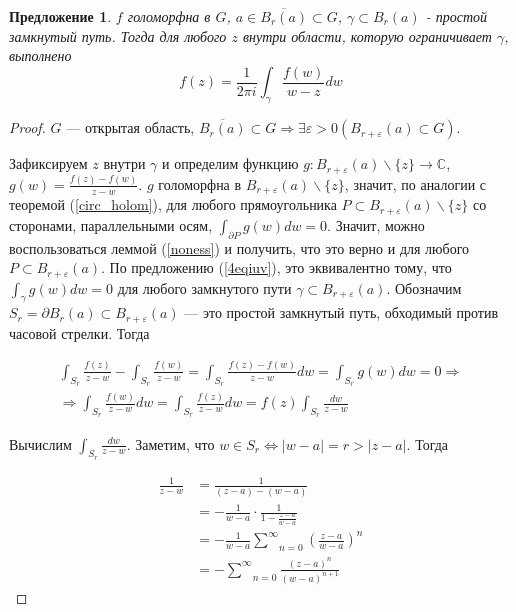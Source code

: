 \documentclass[12pt]{article}
\renewcommand{\C}{\mathbb{C}}
\newcommand{\Ra}{\Rightarrow}
\renewcommand{\iff}{\Leftrightarrow}
\newcounter{cnt}
\theoremstyle{thmnote}
\newtheorem{proposition}[cnt]{Предложение}
\theoremstyle{remark}
\theoremstyle{defnote}
\begin{document}
\begin{proposition}
    $f$ голоморфна в $G$, $a \in \overline{B_r(a)} \subset G$, $\gamma \subset B_r(a)$ - простой замкнутый путь. Тогда для любого $z$ внутри области, которую ограничивает $\gamma$, выполнено
    \begin{equation*}
        f(z) = \frac{1}{2 \pi i} \int_\gamma \frac{f(w)}{w - z} dw
    \end{equation*}
\end{proposition}
\begin{proof}
    $G$ --- открытая область, $\overline{B_r(a)} \subset G \Ra \exists \varepsilon > 0 \left( B_{r + \varepsilon}(a) \subset G \right)$.

    Зафиксируем $z$ внутри $\gamma$ и определим функцию $g: B_{r + \varepsilon}(a)\backslash\{z\} \to \C$, $g(w) = \frac{f(z) - f(w)}{z - w}$. $g$ голоморфна в $B_{r + \varepsilon}(a)\backslash\{z\}$, значит, по аналогии с теоремой (\ref{circ_holom}), для любого прямоугольника $P \subset B_{r + \varepsilon}(a)\backslash\{z\}$ со сторонами, параллельными осям, $\int_{\partial P} g(w)dw = 0$. Значит, можно воспользоваться леммой (\ref{noness}) и получить, что это верно и для любого $P \subset B_{r + \varepsilon}(a)$. По предложению (\ref{4eqiuv}), это эквивалентно тому, что $\int_{\gamma} g(w)dw = 0$ для любого замкнутого пути $\gamma \subset B_{r + \varepsilon}(a)$. Обозначим $S_r = \partial B_r(a) \subset B_{r + \varepsilon}(a)$ --- это простой замкнутый путь, обходимый против часовой стрелки. Тогда

    \begin{gather*}
        \int_{S_r} \frac{f(z)}{z - w} - \int_{S_r} \frac{f(w)}{z - w} = \int_{S_r} \frac{f(z) - f(w)}{z - w}dw = \int_{S_r} g(w)dw = 0 \Ra \\
        \Ra \int_{S_r} \frac{f(w)}{z - w}dw = \int_{S_r} \frac{f(z)}{z - w}dw = f(z) \int_{S_r} \frac{dw}{z - w}
    \end{gather*}

    Вычислим $\int_{S_r} \frac{dw}{z - w}$. Заметим, что $w \in S_r \iff |w - a| = r > |z - a|$. Тогда

    \begin{align*}
        \frac{1}{z - w} & = \frac{1}{(z - a) - (w - a)} \\&= - \frac{1}{w - a} \cdot \frac{1}{1 - \frac{z - a}{w - a}} \\&= - \frac{1}{w - a} \underset{n = 0}{\overset{\infty}{\sum}} \left( \frac{z - a}{w - a} \right)^n \\&= - \underset{n = 0}{\overset{\infty}{\sum}} \frac{(z - a)^n}{(w - a)^{n+1}}
    \end{align*}


\end{proof}
\end{document}
